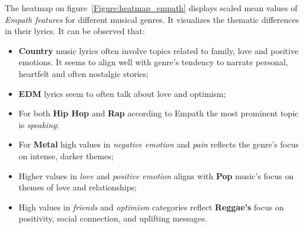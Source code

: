 The heatmap on figure~\ref{Figure:heatmap_empath} displays scaled mean
values of \textit{Empath features} for different musical genres. It visualizes
the thematic  differences in their lyrics. It can be observed that:
\begin{itemize}
  \item \textbf{Country} music lyrics often involve topics related to family,
    love and  positive emotions. It seems to align well with genre's tendency
    to narrate personal, heartfelt and often nostalgic stories;
  \item \textbf{EDM} lyrics seem to often talk about love and optimism;
  \item For both \textbf{Hip Hop} and \textbf{Rap} according to Empath  the
    most prominent topic is \textit{speaking};
  \item For \textbf{Metal} high values in \textit{negative emotion} and
    \textit{pain} reflects the genre's focus on intense, darker themes;
  \item Higher values in \textit{love} and \textit{positive emotion}
    aligns with \textbf{Pop} music’s focus on themes of love and relationships;
  \item High values in \textit{friends} and \textit{optimism} categories
    reflect \textbf{Reggae's} focus on positivity, social connection, and
    uplifting messages.
\end{itemize}

